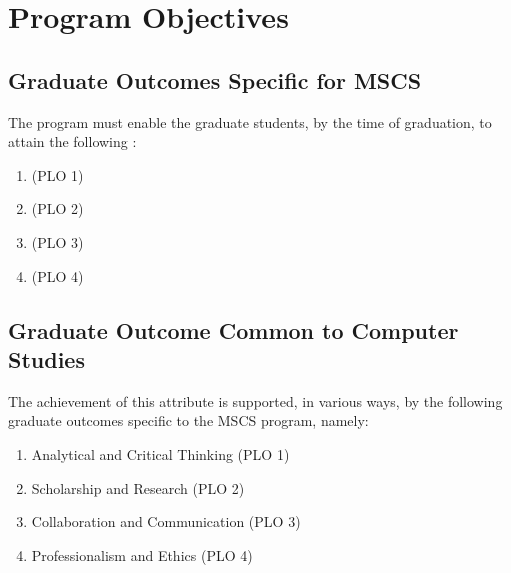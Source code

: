 \documentclass[11pt,a4paper]{article}
\begin{document}


\newpage
\section{Program Objectives}



\subsection{Graduate Outcomes Specific for MSCS}

The program must enable the graduate students, by the time of graduation, to attain the following :
\begin{enumerate}

\item {\bf {}} (PLO 1)\\

\item {\bf {}} (PLO 2)\\

\item {\bf {}} (PLO 3)\\

\item {\bf {}} (PLO 4)\\




\end{enumerate}

\subsection{Graduate Outcome Common to Computer Studies}

\begin{quote}
\textit{}
\end{quote}

The achievement of this attribute is supported, in various ways, by the following graduate outcomes specific to the MSCS program, namely:
\begin{enumerate}
\item Analytical and Critical Thinking (PLO 1)
\item Scholarship and Research (PLO 2)
\item Collaboration and Communication (PLO 3)
\item Professionalism and Ethics (PLO 4)
\end{enumerate}
\end{document}
